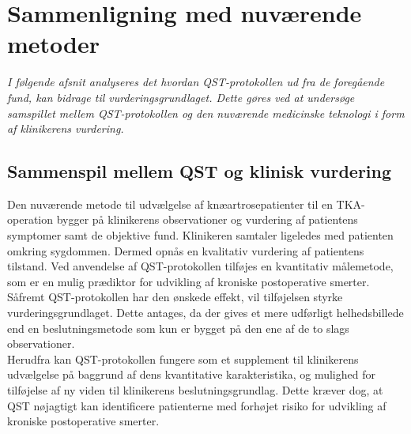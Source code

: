 \section{Sammenligning med nuværende metoder}
\textit{I følgende afsnit analyseres det hvordan QST-protokollen ud fra de foregående fund, kan bidrage til vurderingsgrundlaget. Dette gøres ved at undersøge samspillet mellem QST-protokollen og den nuværende medicinske teknologi i form af klinikerens vurdering.}

\subsection{Sammenspil mellem QST og klinisk vurdering} 
Den nuværende metode til udvælgelse af knæartrosepatienter til en TKA-operation bygger på klinikerens observationer og vurdering af patientens symptomer samt de objektive fund. Klinikeren samtaler ligeledes med patienten omkring sygdommen. Dermed opnås en kvalitativ vurdering af patientens tilstand. \citep{skou2016} \citep{Troelsen2012} Ved anvendelse af QST-protokollen tilføjes en kvantitativ målemetode, som er en mulig prædiktor for udvikling af kroniske postoperative smerter. Såfremt QST-protokollen har den ønskede effekt, vil tilføjelsen styrke vurderingsgrundlaget. Dette antages, da der gives et mere udførligt helhedsbillede end en beslutningsmetode som kun er bygget på den ene af de to slags observationer. \citep{Gronmo2012} \\
Herudfra kan QST-protokollen fungere som et supplement til klinikerens udvælgelse på baggrund af dens kvantitative karakteristika, og mulighed for tilføjelse af ny viden til klinikerens beslutningsgrundlag. Dette kræver dog, at QST nøjagtigt kan identificere patienterne med forhøjet risiko for udvikling af kroniske postoperative smerter.   

